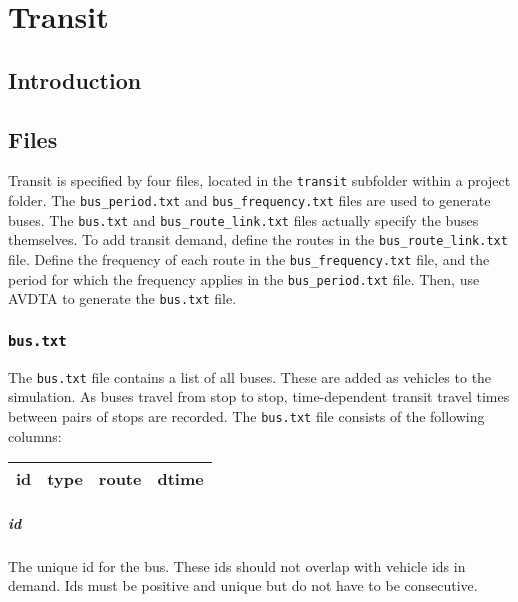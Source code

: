 \chapter{Transit}
\label{ch:transit}

\section{Introduction}

\section{Files}
Transit is specified by four files, located in the \texttt{transit} subfolder within a project folder. The \texttt{bus\_period.txt} and \texttt{bus\_frequency.txt} files are used to generate buses. The \texttt{bus.txt} and \texttt{bus\_route\_link.txt} files actually specify the buses themselves. To add transit demand, define the routes in the \texttt{bus\_route\_link.txt} file. Define the frequency of each route in the \texttt{bus\_frequency.txt} file, and the period for which the frequency applies in the \texttt{bus\_period.txt} file. Then, use AVDTA to generate the \texttt{bus.txt} file.


\subsection{\texttt{bus.txt}}
The \texttt{bus.txt} file contains a list of all buses. These are added as vehicles to the simulation. As buses travel from stop to stop, time-dependent transit travel times between pairs of stops are recorded. The \texttt{bus.txt} file consists of the following columns:
\begin{center}
\begin{tabular}{cccc}
	\hline
	id & type & route & dtime\\\hline
\end{tabular}
\end{center}
\paragraph*{id} The unique id for the bus. These ids should not overlap with vehicle ids in demand. Ids must be positive and unique but do not have to be consecutive.
